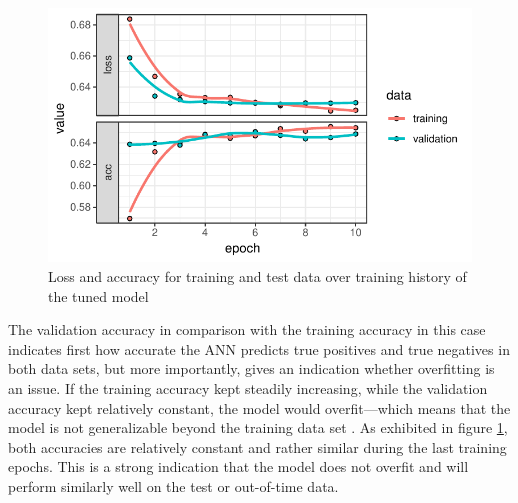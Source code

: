 \documentclass[12pt,a4paper]{article}
\begin{document}
\begin{figure}[ht]
	\centering
  \includegraphics[scale=0.8]{figures/train_history.pdf}
	\caption{Loss and accuracy for training and test data over training history of the tuned model}
	\label{fig_history}
\end{figure}
The validation accuracy in comparison with the training accuracy in this case indicates first how accurate the ANN predicts true positives 
and true negatives in both data sets, but more importantly, gives an indication whether overfitting is an issue.
If the training accuracy kept steadily increasing, while the validation accuracy kept relatively constant, the model would overfit---which means
that the model is not generalizable beyond the training data set \citep{hansenNeuralNetworkEnsembles1990}.
As exhibited in figure \ref{fig_history}, both accuracies are relatively constant and rather similar during the last training epochs.
This is a strong indication that the model does not overfit and will perform similarly well on the test or out-of-time data.
\end{document}
